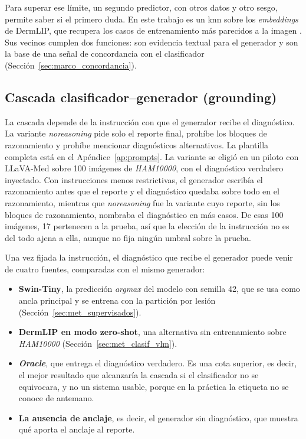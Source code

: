 

Para superar ese límite, un segundo predictor, con otros datos y otro sesgo, permite saber si el primero duda. En este
trabajo es un \gls{knn}
sobre los \emph{embeddings} de DermLIP, que recupera los casos de entrenamiento más parecidos a la imagen
\cite{cover1967nearest}. Sus vecinos cumplen dos funciones: son evidencia textual para el generador y son la base de
una señal de concordancia con el clasificador (Sección~\ref{sec:marco_concordancia}).

\subsection{Cascada clasificador--generador (grounding)}
\label{sec:met_cascada}

La cascada depende de la instrucción con que el generador recibe el diagnóstico. La variante \emph{noreasoning} pide
solo el reporte final, prohíbe los bloques de razonamiento y prohíbe mencionar diagnósticos alternativos. La plantilla
completa está en el Apéndice~\ref{ap:prompts}. La variante se eligió en un piloto con LLaVA-Med sobre 100 imágenes de
\emph{HAM10000}, con el diagnóstico verdadero inyectado. Con instrucciones menos restrictivas, el generador escribía el
razonamiento antes que el reporte y el diagnóstico quedaba sobre todo en el razonamiento, mientras que
\emph{noreasoning} fue la variante cuyo reporte, sin los bloques de razonamiento, nombraba el diagnóstico en más
casos. De esas 100 imágenes, 17 pertenecen a la prueba, así que la elección de la instrucción no es del todo ajena a
ella, aunque no fija ningún umbral sobre la prueba.

Una vez fijada la instrucción, el diagnóstico que recibe el generador puede venir de cuatro fuentes, comparadas con el
mismo generador:
\begin{itemize}[leftmargin=1.6em]
    \item \textbf{Swin-Tiny}, la predicción \emph{argmax} del modelo con semilla 42, que se usa como ancla principal y se
        entrena con la partición por lesión (Sección~\ref{sec:met_supervisados}).
    \item \textbf{DermLIP en modo zero-shot}, una alternativa sin entrenamiento sobre \emph{HAM10000}
        (Sección~\ref{sec:met_clasif_vlm}).
    \item \textbf{\emph{Oracle}}, que entrega el diagnóstico verdadero. Es una cota superior, es decir, el mejor
        resultado que alcanzaría la cascada si el clasificador no se equivocara, y no un sistema usable, porque en la
        práctica la etiqueta no se conoce de antemano.
    \item \textbf{La ausencia de anclaje}, es decir, el generador sin diagnóstico, que muestra qué aporta el anclaje al
        reporte.
\end{itemize}

